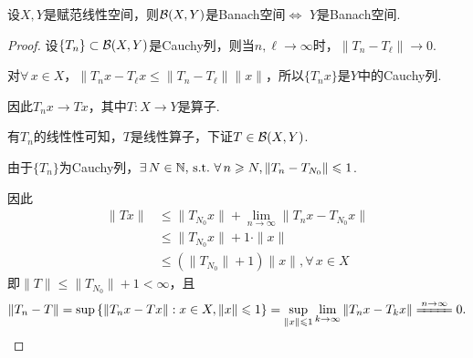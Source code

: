 \begin{definition}[]
    设$X,Y$是赋范线性空间，则$\mathcal{B}(X,Y)$是Banach空间$\iff$ $Y$是Banach空间.
\end{definition}
\begin{proof}
    设$\{T_n\}\subset \mathcal{B}(X,Y)$是Cauchy列，则当$n,\ell\to\infty$时，$\|T_n-T_\ell\|\to 0$.\par
    对$\forall\, x\in X$，$\|T_n x-T_\ell x\leq \|T_n-T_\ell\|\|x\|$，所以$\{T_n x\}$是$Y$中的Cauchy列.\par
    因此$T_n x\to Tx$，其中$T:X\to Y$是算子.\par
    有$T_n$的线性性可知，$T$是线性算子，下证$T\in\mathcal{B}(X,Y)$.\par
    由于$\{T_n\}$为Cauchy列，$\exists\, N\in\mathbb{N},\operatorname{\,\text{s.t.}}\,\forall\, n\geqslant N,\|T_n-T_{N_0}\|\leqslant 1$.\par
    因此\begin{align*}
        \|Tx\| &\leq \|T_{N_0}x\|+\lim_{n\to\infty}\|T_n x-T_{N_0} x\| \\
        &\leq \|T_{N_0}x\|+1\cdot\|x\| \\
        &\leq \left(\|T_{N_0}\|+1\right)\|x\|,\forall\, x\in X
    \end{align*}
    即$\|T\|\leq \|T_{N_0}\|+1<\infty$，且
    \begin{equation*}
        \|T_n-T\|=\sup\left\{\|T_n x-Tx\|:x\in X,\|x\|\leq 1\right\}=\sup_{\|x\|\leq 1}\lim_{k\to\infty}\|T_n x-T_k x\|\xlongequal{n\to \infty}0.\qedhere
    \end{equation*}
\end{proof}

